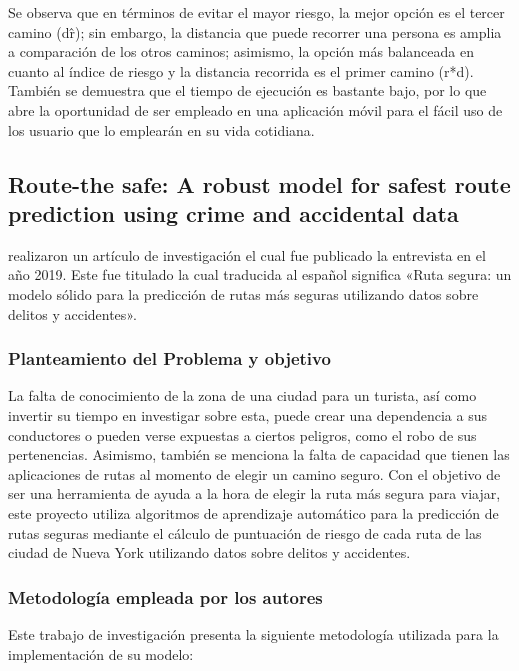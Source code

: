 
Se observa que en términos de evitar el mayor riesgo, la mejor opción es el tercer camino (d\^r); sin embargo, la distancia que puede recorrer una persona es amplia a comparación de los otros caminos; asimismo, la opción más balanceada en cuanto al índice de riesgo y la distancia recorrida es el primer camino (r*d). También se demuestra que el tiempo de ejecución es bastante bajo, por lo que abre la oportunidad de ser empleado en una aplicación móvil para el fácil uso de los usuario que lo emplearán en su vida cotidiana.


\subsection{Route-the safe: A robust model for safest route prediction using crime and accidental data \citep*{pr_Soni}}
\citeauthor{pr_Soni} realizaron un artículo de investigación el cual fue publicado la entrevista en el año 2019. Este fue titulado  la cual traducida al español significa «Ruta segura: un modelo sólido para la predicción de rutas más seguras utilizando datos sobre delitos y accidentes».

\subsubsection{Planteamiento del Problema y objetivo }
La falta de conocimiento de la zona de una ciudad para un turista, así como invertir su tiempo en investigar sobre esta, puede crear una dependencia a sus conductores o pueden verse expuestas a ciertos peligros, como el robo de sus pertenencias. Asimismo, también se menciona la falta de capacidad que tienen las aplicaciones de rutas al momento de elegir un camino seguro. Con el objetivo de ser una herramienta de ayuda a la hora de elegir la ruta más segura para viajar, este proyecto  utiliza algoritmos de aprendizaje automático para la predicción de rutas seguras mediante el cálculo de puntuación de riesgo de cada ruta de las ciudad de Nueva York utilizando datos sobre delitos y accidentes.
\subsubsection{Metodología empleada por los autores}
Este trabajo de investigación presenta la siguiente metodología utilizada para la implementación de su modelo:

